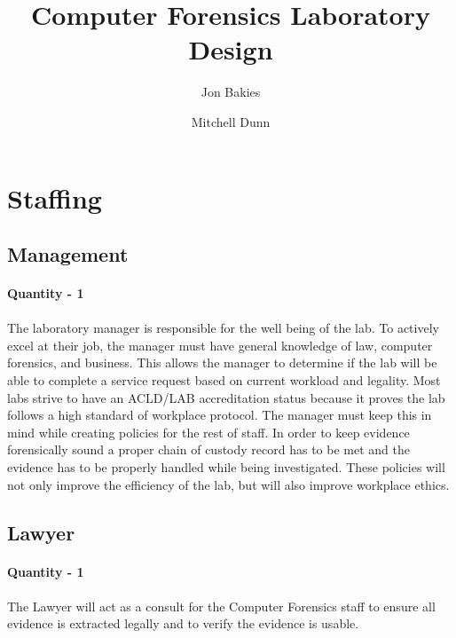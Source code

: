 \documentclass[12pt]{article}
\begin{document}
\title{Computer Forensics Laboratory Design}
\author{Jon Bakies \and Mitchell Dunn} 

\maketitle
\newpage

\tableofcontents
\newpage

\section{Staffing}
\subsection {Management} 
\paragraph{Quantity - 1}
\paragraph{} The laboratory manager is responsible for the well being of the lab.
To actively excel at their job, the manager must have general knowledge of law, computer forensics, and business.
This allows the manager to determine if the lab will be able to complete a service request based on current workload and legality. 
Most labs strive to have an ACLD/LAB accreditation status because it proves the lab follows a high standard of workplace protocol.
The manager must keep this in mind while creating policies for the rest of staff.
In order to keep evidence forensically sound a proper chain of custody record has to be met and the evidence has to be properly handled while being investigated.
These policies will not only improve the efficiency of the lab, but will also improve workplace ethics.
\subsection{Lawyer } 
\paragraph{Quantity - 1}
\paragraph{} The Lawyer will act as a consult for the Computer Forensics staff to ensure all evidence is extracted legally and to verify the evidence is usable.
\end{document}
